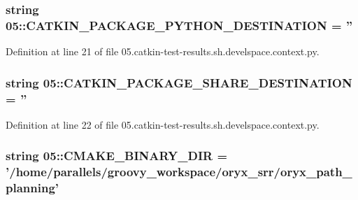 \subsubsection[{\-C\-A\-T\-K\-I\-N\-\_\-\-P\-A\-C\-K\-A\-G\-E\-\_\-\-P\-Y\-T\-H\-O\-N\-\_\-\-D\-E\-S\-T\-I\-N\-A\-T\-I\-O\-N}]{\setlength{\rightskip}{0pt plus 5cm}string 05\-::{\bf \-C\-A\-T\-K\-I\-N\-\_\-\-P\-A\-C\-K\-A\-G\-E\-\_\-\-P\-Y\-T\-H\-O\-N\-\_\-\-D\-E\-S\-T\-I\-N\-A\-T\-I\-O\-N} = ''}\label{namespace05_a7ba0f936755de69e9e4f8590f9edf6ba}


\-Definition at line 21 of file 05.\-catkin-\/test-\/results.\-sh.\-develspace.\-context.\-py.

\subsubsection[{\-C\-A\-T\-K\-I\-N\-\_\-\-P\-A\-C\-K\-A\-G\-E\-\_\-\-S\-H\-A\-R\-E\-\_\-\-D\-E\-S\-T\-I\-N\-A\-T\-I\-O\-N}]{\setlength{\rightskip}{0pt plus 5cm}string 05\-::{\bf \-C\-A\-T\-K\-I\-N\-\_\-\-P\-A\-C\-K\-A\-G\-E\-\_\-\-S\-H\-A\-R\-E\-\_\-\-D\-E\-S\-T\-I\-N\-A\-T\-I\-O\-N} = ''}\label{namespace05_a11fb5d48ec47747b17f20f2acee5ce86}


\-Definition at line 22 of file 05.\-catkin-\/test-\/results.\-sh.\-develspace.\-context.\-py.

\subsubsection[{\-C\-M\-A\-K\-E\-\_\-\-B\-I\-N\-A\-R\-Y\-\_\-\-D\-I\-R}]{\setlength{\rightskip}{0pt plus 5cm}string 05\-::{\bf \-C\-M\-A\-K\-E\-\_\-\-B\-I\-N\-A\-R\-Y\-\_\-\-D\-I\-R} = '/home/parallels/groovy\-\_\-workspace/oryx\-\_\-srr/oryx\-\_\-path\-\_\-planning'}\label{namespace05_a659de7ece5710de28a6720e20c09dd03}


